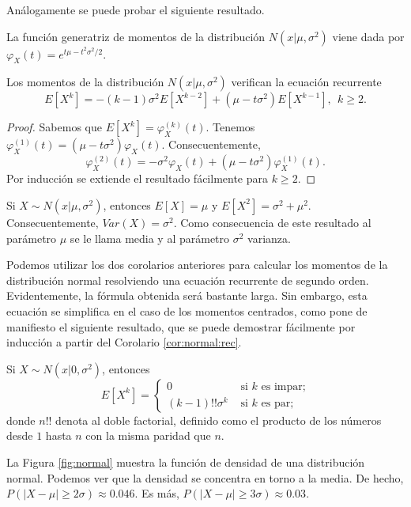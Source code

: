 Análogamente se puede probar el siguiente resultado.

\begin{prop} \label{prop:normal:gm}
    La función generatriz de momentos de la distribución $N(x|\mu, \sigma^2)$ viene dada por $\varphi_X(t) = e^{t\mu - t^2 \sigma^2 / 2}$.
\end{prop}

\begin{cor} \label{cor:normal:rec}
    Los momentos de la distribución $N(x|\mu,\sigma^2)$ verifican la ecuación recurrente
    \[E[X^k] = -(k-1)\sigma^2 E[X^{k-2}] + (\mu - t \sigma^2) E[X^{k-1}], \ \  k \ge 2.\]
\end{cor}
\begin{proof}
    Sabemos que $E[X^k] = \varphi_X^{(k)}(t)$. Tenemos $\varphi_X^{(1)}(t) = (\mu - t \sigma^2) \varphi_X(t)$. Consecuentemente,
    \[\varphi_X^{(2)}(t) = -\sigma^2 \varphi_X(t) + (\mu - t \sigma^2) \varphi_X^{(1)}(t).\]
    Por inducción se extiende el resultado fácilmente para $k \ge 2$.
\end{proof}

\begin{cor}
    Si $X \sim N(x|\mu,\sigma^2)$, entonces $E[X] = \mu$ y $E[X^2] = \sigma^2 + \mu^2$. Consecuentemente, $Var(X) = \sigma^2$. Como consecuencia de este resultado al parámetro $\mu$ se le llama media y al parámetro $\sigma^2$ varianza.
\end{cor}

Podemos utilizar los dos corolarios anteriores para calcular los momentos de la distribución normal resolviendo una ecuación recurrente de segundo orden. Evidentemente, la fórmula obtenida será bastante larga. Sin embargo, esta ecuación se simplifica en el caso de los momentos centrados, como pone de manifiesto el siguiente resultado, que se puede demostrar fácilmente por inducción a partir del Corolario \ref{cor:normal:rec}.

\begin{cor}
    Si $X \sim N(x|0,\sigma^2)$, entonces
    \[E[X^k] = \begin{cases} 0 & \text{ si } k \text{ es impar;} \\ (k-1)!! \sigma^{k} & \text{ si } k \text{ es par;} \end{cases}\]
    donde $n!!$ denota al doble factorial, definido como el producto de los números desde $1$ hasta $n$ con la misma paridad que $n$.
\end{cor}

La Figura \ref{fig:normal} muestra la función de densidad de una distribución normal. Podemos ver que la densidad se concentra en torno a la media. De hecho, $P(|X - \mu| \ge 2\sigma) \approx 0.046$. Es más, $P(|X - \mu| \ge 3\sigma) \approx 0.03$.

